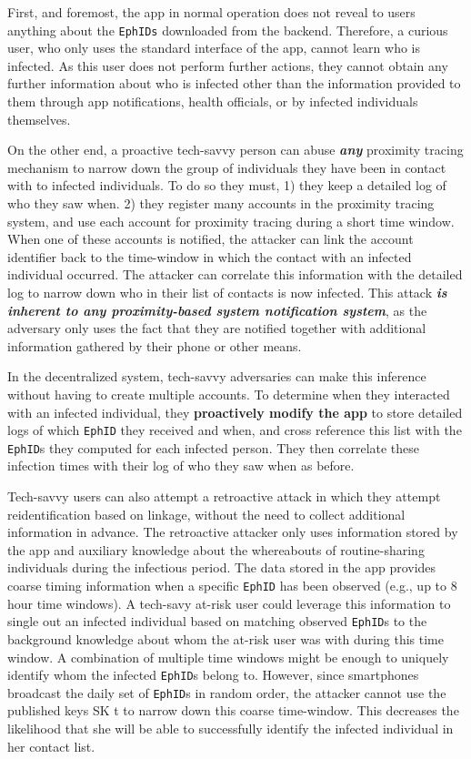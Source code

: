 \documentclass[10.8pt,a4paper]{article}
\begin{document}
First, and foremost, the app in normal operation does not reveal to users anything about the \texttt{EphIDs} downloaded from the backend. Therefore, a curious user, who only uses the standard interface of the app, cannot learn who is infected. As this user does not perform further actions, they cannot obtain any further information about who is infected other than the information provided to them through app notifications, health officials, or by infected individuals themselves.

On the other end, a proactive tech-savvy person can abuse \textbf{\textit{any}} proximity tracing mechanism to narrow down the group of individuals they have been in contact with to infected individuals. To do so they must, 1) they keep a detailed log of who they saw when. 2) they register many accounts in the proximity tracing system, and use each account for proximity tracing during a short time window. When one of these accounts is notified, the attacker can link the account identifier back to the time-window in which the contact with an infected individual occurred. The attacker can correlate this information with the detailed log to narrow down who in their list of contacts is now infected. This attack \textbf{\textit{is inherent to any proximity-based system notification system}}, as the adversary only uses the fact that they are notified together with additional information gathered by their phone or other means.
 
In the decentralized system, tech-savvy adversaries can make this inference without having
to create multiple accounts. To determine when they interacted with an infected individual, they \textbf{proactively modify the app} to store detailed logs of which \texttt{EphID} they received and when, and cross reference this list with the \texttt{EphID}s they computed for each infected person. They then correlate these infection times with their log of who they saw when as before.

Tech-savvy users can also attempt a retroactive attack in which they attempt reidentification based on linkage, without the need to collect additional information in advance. The retroactive attacker only uses information stored by the app and auxiliary knowledge about the whereabouts of routine-sharing individuals during the infectious period. The data stored in the app provides coarse timing information when a specific \texttt{EphID} has been observed (e.g., up to 8 hour time windows). A tech-savy at-risk user could leverage this information to single out an infected individual based on matching observed \texttt{EphID}s to the background knowledge about whom the at-risk user was with during this time window. A combination of multiple time windows might be enough to uniquely identify whom the infected \texttt{EphID}s belong to. However, since smartphones broadcast the daily set of \texttt{EphID}s in random order, the attacker cannot use the published keys SK t to narrow down this coarse time-window. This decreases the likelihood that she will be able to successfully identify the infected individual in her contact list.
\end{document}

